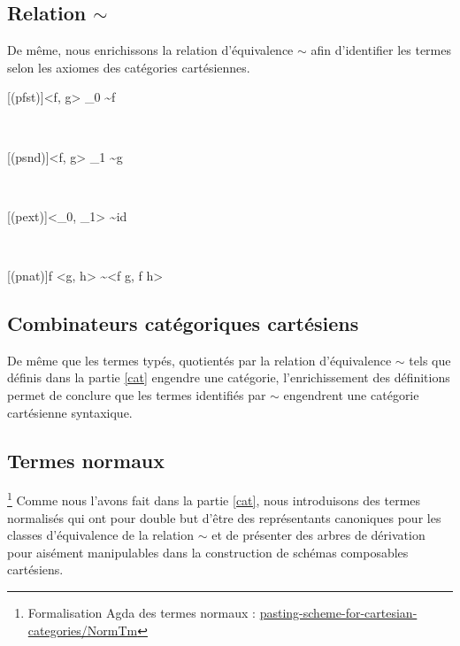 \documentclass[conference]{IEEEtran}
\begin{document}
	\subsection{Relation $\sim$}
	De même, nous enrichissons la relation d'équivalence $\sim$ afin d'identifier les termes selon les axiomes des catégories cartésiennes.
	
	\begin{center}
		\begin{prooftree}
			[(pfst)]{\left<f, g\right> \cdot \pi_0 \sim f}
		\end{prooftree} \\
		\vspace{20pt}
		\begin{prooftree}
			\hypo[]{\Gamma \vdash f : x \rightarrow y}
			\hypo[]{\Gamma \vdash g : x \rightarrow z}
			[(psnd)]{\left<f, g\right> \cdot \pi_1 \sim g}
		\end{prooftree} \\
		\vspace{20pt}
		\begin{prooftree}
			[(pext)]{\left<\pi_0, \pi_1\right> \sim id}
		\end{prooftree} \\
		\vspace{20pt}
		\begin{prooftree}
			\hypo[]{\Gamma \vdash g : y \rightarrow z}
			\hypo[]{\Gamma \vdash h : y \rightarrow z}
			[(pnat)]{f \cdot \left<g, h\right> \sim \left<f \cdot g, f \cdot h\right>}
		\end{prooftree}
	\end{center}
	
	\subsection{Combinateurs catégoriques cartésiens}
	
	De même que les termes typés, quotientés par la relation d'équivalence $\sim$ tels que définis dans la partie \ref{cat} engendre une catégorie, l'enrichissement des définitions permet de conclure que les termes identifiés par $\sim$ engendrent une catégorie cartésienne syntaxique.
	
	\subsection{Termes normaux}
	\footnote{Formalisation Agda des termes normaux : \href{https://github.com/ehouget/L3-ENS-Internship/tree/main/pasting-scheme-for-cartesian-categories/NormTm}{pasting-scheme-for-cartesian-categories/NormTm}}
	Comme nous l'avons fait dans la partie \ref{cat}, nous introduisons des termes normalisés qui ont pour double but d'être des représentants canoniques pour les classes d'équivalence de la relation $\sim$ et de présenter des arbres de dérivation pour aisément manipulables dans la construction de schémas composables cartésiens.
	
\end{document}

